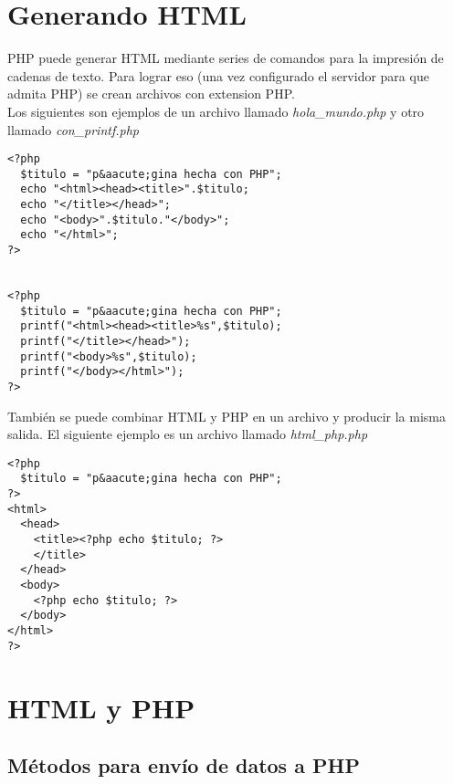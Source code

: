 \documentclass[12pt,spanish,twocolumn,lettersize]{article}
\begin{document}
\section{Generando HTML}
PHP puede generar HTML mediante series de comandos para la impresi\'on de cadenas de texto. Para lograr eso (una vez configurado el servidor para que admita PHP) se crean archivos con extension PHP.\\
Los siguientes son ejemplos de un archivo llamado \emph{hola\_mundo.php} y otro llamado \emph{con\_printf.php}
\begin{verbatim}
<?php
  $titulo = "p&aacute;gina hecha con PHP";
  echo "<html><head><title>".$titulo;
  echo "</title></head>";
  echo "<body>".$titulo."</body>";
  echo "</html>";
?>


<?php
  $titulo = "p&aacute;gina hecha con PHP";
  printf("<html><head><title>%s",$titulo);
  printf("</title></head>");
  printf("<body>%s",$titulo);
  printf("</body></html>");
?>
\end{verbatim}
Tambi\'en se puede combinar HTML y PHP en un archivo y producir la misma salida. El siguiente ejemplo es un archivo llamado \emph{html\_php.php}
\begin{verbatim}
<?php
  $titulo = "p&aacute;gina hecha con PHP";
?>
<html>
  <head>
    <title><?php echo $titulo; ?>
    </title>
  </head>
  <body>
    <?php echo $titulo; ?>
  </body>
</html>
?>

\end{verbatim}
\section{HTML y PHP}
\subsection{M\'etodos para env\'io de datos a PHP}
\end{document}

